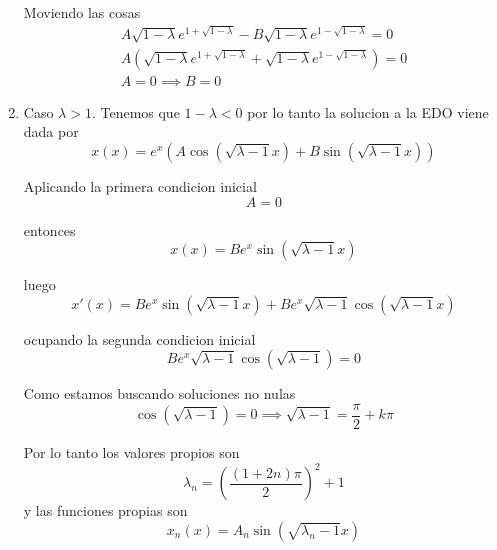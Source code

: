 \documentclass[../main.tex]{subfiles}
\begin{document}
\begin{solution}
\begin{enumerate}
            Moviendo las cosas
            \begin{gather*}
              A\sqrt{1 - \lambda}e^{1 + \sqrt{1 - \lambda}}  - B\sqrt{1 - \lambda}e^{1 - \sqrt{1 - \lambda}} = 0\\
              A(\sqrt{1 - \lambda}e^{1 + \sqrt{1 - \lambda}} + \sqrt{1 - \lambda}e^{1 - \sqrt{1 - \lambda}}) = 0\\
              A = 0 \implies B = 0
            \end{gather*}
      \item Caso $\lambda > 1$. Tenemos que $1 - \lambda < 0$ por lo tanto la solucion a la EDO viene dada por
            \begin{equation*}
              x(x) = e^{x}(A \cos(\sqrt{\lambda - 1} x) + B \sin(\sqrt{\lambda - 1}x))
            \end{equation*}

            Aplicando la primera condicion inicial
            \begin{equation*}
              A = 0
            \end{equation*}

            entonces
            \begin{equation*}
              x(x) = B e^{x} \sin(\sqrt{\lambda - 1}x)
            \end{equation*}

            luego
            \begin{equation*}
              x'(x) = Be^{x} \sin(\sqrt{\lambda - 1} x) + Be^{x} \sqrt{\lambda - 1}\cos(\sqrt{\lambda - 1} x)
            \end{equation*}

            ocupando la segunda condicion inicial
            \begin{equation*}
              Be^{x}\sqrt{\lambda - 1} \cos(\sqrt{\lambda - 1}) = 0
            \end{equation*}

            Como estamos buscando soluciones no nulas
            \begin{equation*}
              \cos(\sqrt{\lambda - 1}) = 0 \implies \sqrt{\lambda - 1} = \frac{\pi}{2} + k \pi
            \end{equation*}

            Por lo tanto los valores propios son
            \begin{equation*}
              \lambda_{n} = (\frac{(1 + 2n)\pi}{2})^{2} + 1
            \end{equation*}
            y las funciones propias son
            \begin{equation*}
              x_{n}(x) = A_{n}\sin(\sqrt{\lambda_{n} - 1}x)
            \end{equation*}


\end{enumerate}
\end{solution}
\end{document}
